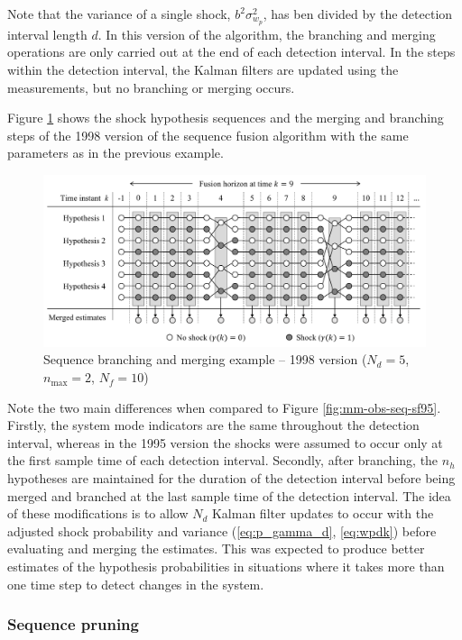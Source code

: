 {Note that the variance of a single shock, $b^2\sigma_{w_p}^2$, has ben divided by the detection interval length $d$. In this version of the algorithm, the branching and merging operations are only carried out at the end of each detection interval. In the steps within the detection interval, the Kalman filters are updated using the measurements, but no branching or merging occurs.

Figure \ref{fig:mm-obs-seq-sf98} shows the shock hypothesis sequences and the merging and branching steps of the 1998 version of the sequence fusion algorithm with the same parameters as in the previous example.
\begin{figure}[ht]
	\centering
	\includegraphics[width=15cm]{images/mm_obs_seq_sf98.pdf}
	\caption{Sequence branching and merging example – 1998 version ($N_d=5$, $n_\text{max}=2$, $N_f=10$)}
	\label{fig:mm-obs-seq-sf98}
\end{figure}
Note the two main differences when compared to Figure \ref{fig:mm-obs-seq-sf95}. Firstly, the system mode indicators are the same throughout the detection interval, whereas in the 1995 version the shocks were assumed to occur only at the first sample time of each detection interval. Secondly, after branching, the $n_h$ hypotheses are maintained for the duration of the detection interval before being merged and branched at the last sample time of the detection interval. The idea of these modifications is to allow $N_d$ Kalman filter updates to occur with the adjusted shock probability and variance (\ref{eq:p_gamma_d}, \ref{eq:wpdk}) before evaluating and merging the estimates. This was expected to produce better estimates of the hypothesis probabilities in situations where it takes more than one time step to detect changes in the system.

\subsubsection{Sequence pruning} \label{sec:pruning}

}

